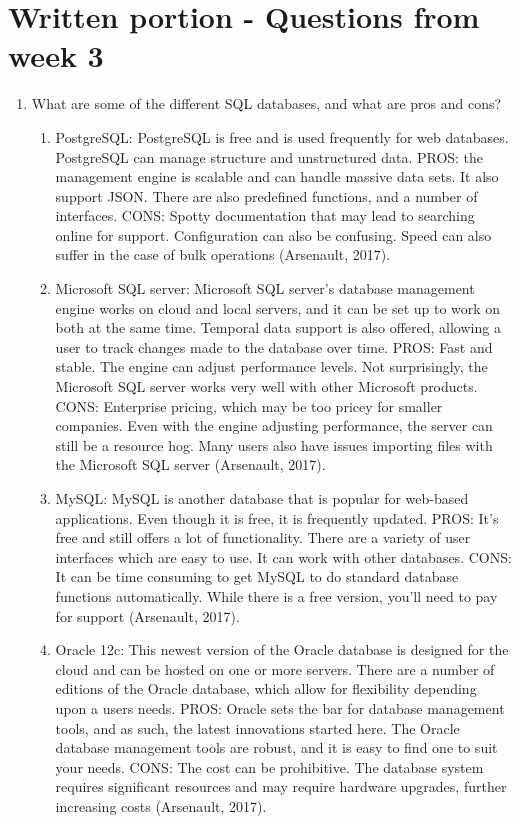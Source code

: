 \documentclass[]{article}
\begin{document}
\section{Written portion - Questions from week 3}
\begin{enumerate}
\item What are some of the different SQL databases, and what are pros and cons?
\begin{enumerate}
	\item PostgreSQL:  PostgreSQL is free and is used frequently for web databases.  PostgreSQL can manage structure and unstructured data.  PROS: the management engine is scalable and can handle massive data sets.  It also support JSON.  There are also predefined functions, and a number of interfaces.  CONS: Spotty documentation that may lead to searching online for support.  Configuration can also be confusing.  Speed can also suffer in the case of bulk operations (Arsenault, 2017). 
	
	\item Microsoft SQL server: Microsoft SQL server's database management engine works on cloud and local servers, and it can be set up to work on both at the same time.  Temporal data support is also offered, allowing a user to track changes made to the database over time.  PROS: Fast and stable.  The engine can adjust performance levels.  Not surprisingly, the Microsoft SQL server works very well with other Microsoft products. CONS: Enterprise pricing, which may be too pricey for smaller companies.  Even with the engine adjusting performance, the server can still be a resource hog.  Many users also have issues importing files with the Microsoft SQL server (Arsenault, 2017). 
	
	\item MySQL:  MySQL is another database that is popular for web-based applications.  Even though it is free, it is frequently updated.  PROS: It's free and still offers a lot of functionality.  There are a variety of user interfaces which are easy to use.  It can work with other databases.  CONS: It can be time consuming to get MySQL to do standard database functions automatically.  While there is a free version, you'll need to pay for support (Arsenault, 2017).
	
	\item Oracle 12c:  This newest version of the Oracle database is designed for the cloud and can be hosted on one or more servers.  There are a number of editions of the Oracle database, which allow for flexibility depending upon a users needs.  PROS: Oracle sets the bar for database management tools, and as such, the latest innovations started here.  The Oracle database management tools are robust, and it is easy to find one to suit your needs.  CONS:  The cost can be prohibitive.  The database system requires significant resources and may require hardware upgrades, further increasing costs (Arsenault, 2017).
\end{enumerate}



\end{enumerate}
\end{document}
